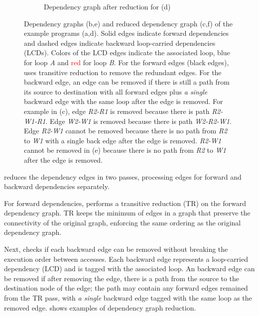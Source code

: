 \begin{figure}
\begin{subfigure}[b]{0.3\textwidth}
\caption{
  Dependency graph after reduction for (d)
}
\end{subfigure}
\caption[Examples for dependency graph reduction]{
  Dependency graphs (b,e) and reduced dependency graph (c,f) of the example programs (a,d).
  Solid edges indicate forward dependencies and
  dashed edges indicate backward loop-carried dependencies (LCDs).
  Colors of the LCD edges indicate the associated loop, \textcolor{pureblue}{blue} for loop \emph{A} and
  \textcolor{red}{red} for loop \emph{B}.
  For the forward edges (black edges), \name uses transitive reduction to remove the redundant
  edges.
  For the backward edge, an edge can be removed if there is still a path from its source to
  destination with all forward edges plus \emph{a single} backward edge with the same loop after the edge is
  removed.
  For example in (c), edge \emph{R2-R1} is removed because there is path \emph{R2-W1-R1}.
  Edge \emph{W2-W1} is removed because there is path \emph{W2-R2-W1}. 
  Edge \emph{R2-W1} cannot be removed because there is no path from \emph{R2} to \emph{W1} with a
  single back edge after the edge is removed.
  \emph{R2-W1} cannot be
  removed in (e) because there is no path from \emph{R2} to \emph{W1} after the edge is removed.
}
\label{fig:graphred}
\end{figure}

\name reduces the dependency edges in two passes, processing edges for forward and
backward dependencies separately.

For forward dependencies, \name performs a transitive reduction (TR)\cite{tr} on the forward dependency
graph. TR keeps the minimum of edges in a graph that preserve the connectivity of the original
graph, enforcing the same ordering as the original dependency graph.

Next, \name checks if each backward edge can be removed without breaking the execution order between
accesses. 
Each backward edge represents a loop-carried dependency (LCD) and is tagged with the associated loop.
An backward edge can be removed if after removing the edge, there is a path from the source to the
destination node of the edge; the path may contain any forward edges remained from the TR pass,
with \emph{a single} backward edge tagged with the same loop as the removed edge.
 shows examples of dependency graph reduction.


